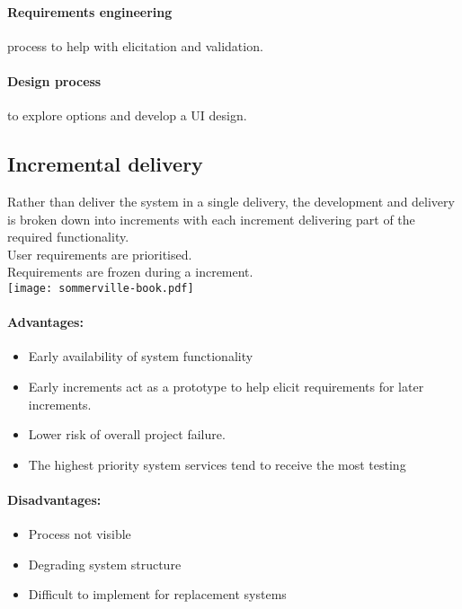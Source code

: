 \documentclass[a4paper,11pt,twocolumn]{report}
\begin{document}
    \paragraph{Requirements engineering} process to help with elicitation and
        validation.
    \paragraph{Design process} to explore options and develop a UI design.
    \subsection{Incremental delivery}
    Rather than deliver the system in a single delivery, the development and
    delivery is broken down into increments with each increment delivering part
    of the required functionality.\\
    User requirements are prioritised.\\
    Requirements are frozen during a increment.\\
    \texttt{[image: sommerville-book.pdf]}\\
    \paragraph{Advantages:}
    \begin{itemize}
        \item Early availability of system functionality
        \item Early increments act as a prototype to help elicit requirements
            for later increments.
        \item Lower risk of overall project failure.
        \item The highest priority system services tend to receive the most
            testing
    \end{itemize}
    \paragraph{Disadvantages:}
    \begin{itemize}
        \item Process not visible
        \item Degrading system structure
        \item Difficult to implement for replacement systems
    \end{itemize}
\end{document}
